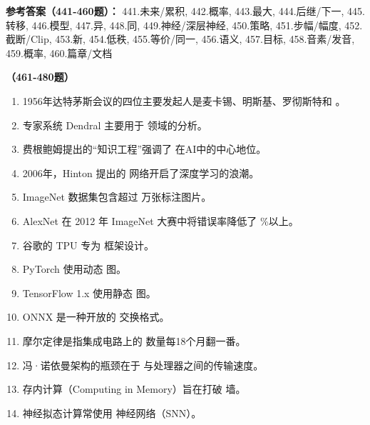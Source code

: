 \textbf{参考答案（441-460题）：}
441.未来/累积, 442.概率, 443.最大, 444.后继/下一, 445.转移, 446.模型, 447.异, 448.同, 449.神经/深层神经, 450.策略, 451.步幅/幅度, 452.截断/Clip, 453.新, 454.低秩, 455.等价/同一, 456.语义, 457.目标, 458.音素/发音, 459.概率, 460.篇章/文档

\vspace{1em}
\textbf{（461-480题）}
\begin{enumerate}[resume,leftmargin=2em,itemsep=1pt]
\item 1956年达特茅斯会议的四位主要发起人是麦卡锡、明斯基、罗彻斯特和 \underline{\hspace{3em}}。
\item 专家系统 Dendral 主要用于 \underline{\hspace{3em}} 领域的分析。
\item 费根鲍姆提出的“知识工程”强调了 \underline{\hspace{3em}} 在AI中的中心地位。
\item 2006年，Hinton 提出的 \underline{\hspace{3em}} 网络开启了深度学习的浪潮。
\item ImageNet 数据集包含超过 \underline{\hspace{3em}} 万张标注图片。
\item AlexNet 在 2012 年 ImageNet 大赛中将错误率降低了 \underline{\hspace{3em}} \%以上。
\item 谷歌的 TPU 专为 \underline{\hspace{3em}} 框架设计。
\item PyTorch 使用动态 \underline{\hspace{3em}} 图。
\item TensorFlow 1.x 使用静态 \underline{\hspace{3em}} 图。
\item ONNX 是一种开放的 \underline{\hspace{3em}} 交换格式。
\item 摩尔定律是指集成电路上的 \underline{\hspace{3em}} 数量每18个月翻一番。
\item 冯·诺依曼架构的瓶颈在于 \underline{\hspace{3em}} 与处理器之间的传输速度。
\item 存内计算（Computing in Memory）旨在打破 \underline{\hspace{3em}} 墙。
\item 神经拟态计算常使用 \underline{\hspace{3em}} 神经网络（SNN）。

\end{enumerate}
